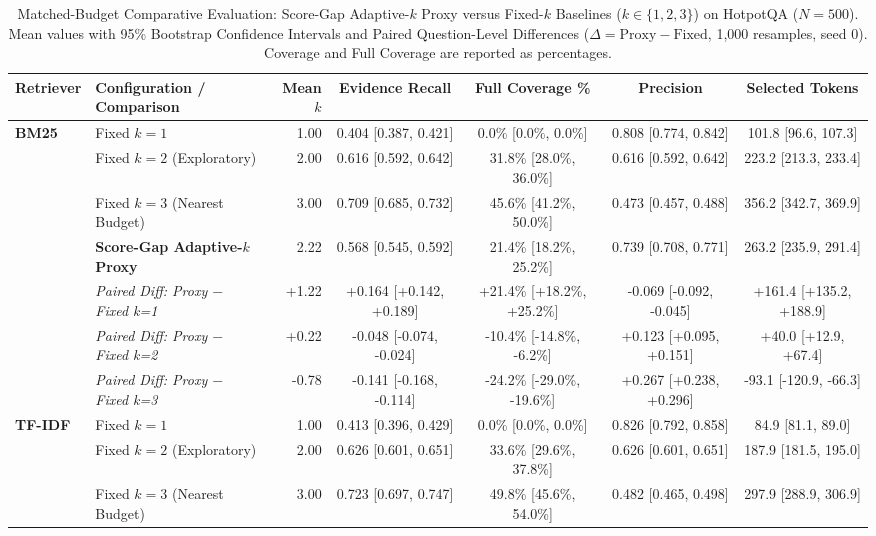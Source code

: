 \begin{table}[t]
\centering
\caption{Matched-Budget Comparative Evaluation: Score-Gap Adaptive-$k$ Proxy versus Fixed-$k$ Baselines ($k \in \{1, 2, 3\}$) on HotpotQA ($N=500$). Mean values with 95\% Bootstrap Confidence Intervals and Paired Question-Level Differences ($\Delta = \text{Proxy} - \text{Fixed}$, 1,000 resamples, seed 0). Coverage and Full Coverage are reported as percentages.}
\label{tab:matched_budget}
\begin{tabular}{llrcccc}
\toprule
\textbf{Retriever} & \textbf{Configuration / Comparison} & \textbf{Mean $k$} & \textbf{Evidence Recall} & \textbf{Full Coverage \%} & \textbf{Precision} & \textbf{Selected Tokens} \\
\midrule
\textbf{BM25} & Fixed $k=1$ & 1.00 & 0.404 [0.387, 0.421] & 0.0\% [0.0\%, 0.0\%] & 0.808 [0.774, 0.842] & 101.8 [96.6, 107.3] \\
 & Fixed $k=2$ (Exploratory) & 2.00 & 0.616 [0.592, 0.642] & 31.8\% [28.0\%, 36.0\%] & 0.616 [0.592, 0.642] & 223.2 [213.3, 233.4] \\
 & Fixed $k=3$ (Nearest Budget) & 3.00 & 0.709 [0.685, 0.732] & 45.6\% [41.2\%, 50.0\%] & 0.473 [0.457, 0.488] & 356.2 [342.7, 369.9] \\
 & \textbf{Score-Gap Adaptive-$k$ Proxy} & 2.22 & 0.568 [0.545, 0.592] & 21.4\% [18.2\%, 25.2\%] & 0.739 [0.708, 0.771] & 263.2 [235.9, 291.4] \\
\cmidrule(lr){2-7}
 & \textit{Paired Diff: Proxy $-$ Fixed k=1} & +1.22 & +0.164 [+0.142, +0.189] & +21.4\% [+18.2\%, +25.2\%] & -0.069 [-0.092, -0.045] & +161.4 [+135.2, +188.9] \\
 & \textit{Paired Diff: Proxy $-$ Fixed k=2} & +0.22 & -0.048 [-0.074, -0.024] & -10.4\% [-14.8\%, -6.2\%] & +0.123 [+0.095, +0.151] & +40.0 [+12.9, +67.4] \\
 & \textit{Paired Diff: Proxy $-$ Fixed k=3} & -0.78 & -0.141 [-0.168, -0.114] & -24.2\% [-29.0\%, -19.6\%] & +0.267 [+0.238, +0.296] & -93.1 [-120.9, -66.3] \\
\midrule
\textbf{TF-IDF} & Fixed $k=1$ & 1.00 & 0.413 [0.396, 0.429] & 0.0\% [0.0\%, 0.0\%] & 0.826 [0.792, 0.858] & 84.9 [81.1, 89.0] \\
 & Fixed $k=2$ (Exploratory) & 2.00 & 0.626 [0.601, 0.651] & 33.6\% [29.6\%, 37.8\%] & 0.626 [0.601, 0.651] & 187.9 [181.5, 195.0] \\
 & Fixed $k=3$ (Nearest Budget) & 3.00 & 0.723 [0.697, 0.747] & 49.8\% [45.6\%, 54.0\%] & 0.482 [0.465, 0.498] & 297.9 [288.9, 306.9] \\

\end{tabular}
\end{table}
